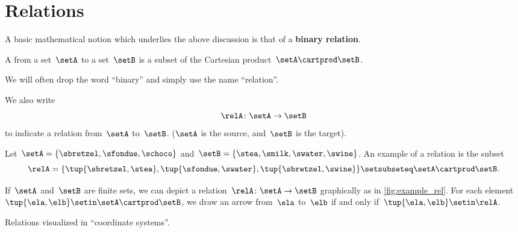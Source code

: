 
\section{Relations}
\label{sec:connection-relations}

A basic mathematical notion which underlies the above discussion is that of a \textbf{binary relation}.

\begin{ctdefinition}
    \label{def:binary-relation}
    A \emph{} from a set~$\setA$ to a set~$\setB$ is a subset of the Cartesian product~$\setA\cartprod \setB$.
\end{ctdefinition}

We will often drop the word ``binary'' and simply use the name ``relation''.

We also write
\begin{equation*}
    \relA \colon \setA \to \setB
\end{equation*}
to indicate a relation from~$\setA$ to~$\setB$.
($\setA$ is the source, and~$\setB$ is the target).

\begin{marginfigure}
    \centering
    \caption{}
    \label{fig:example_rel}
\end{marginfigure}

\begin{example}
    \label{exa:simple-rel}
    Let~$\setA = \{ \sbretzel, \sfondue, \schoco \}$ and~$\setB = \{ \stea, \smilk, \swater, \swine \}$.
    An example of a relation is the subset
    \begin{equation*}
        \relA = \{ \tup{\sbretzel, \stea}, \tup{\sfondue, \swater}, \tup{\sbretzel, \swine} \} \setsubseteq \setA \cartprod \setB.
    \end{equation*}
\end{example}


If~$\setA$ and~$\setB$ are finite sets, we can depict a relation~$\relA \colon \setA \to \setB$ graphically as in \cref{fig:example_rel}.
For each element~$\tup{\ela,\elb} \setin \setA \cartprod \setB$, we draw an arrow from~$\ela$ to~$\elb$ if and only if~$\tup{\ela,\elb} \setin \relA$.

\begin{marginfigure}
    \centering
    \caption{Relations visualized in ``coordinate systems''.}
    \label{fig:example_rel_coord}
\end{marginfigure}

